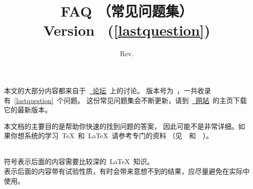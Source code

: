 \documentclass[a4paper]{article}
\begin{document}

 \def\cmdname{命令~(Commands)}
 \def\pkgname{宏包~(Packages)}
 \def\envname{环境~(Environments)}
 \def\Qname{\it 问题}
 \def\CTeXWWW{\href{http://www.ctex.org}{\CTeX{}~网站}}
 \def\CTeXBBS{\href{http://bbs.ctex.org}{\CTeX{}~论坛}}
 \def\CTeXFTP{\href{http://ftp.ctex.org}{\CTeX{} FTP}}


 \pagestyle{fancy}
 \fancyhf{}
 \fancyhead[L]{\small \leftmark}
 \fancyhead[R]{\small \thepage}


\title{{\bf\Huge \CTeX{} FAQ （常见问题集）}\\[1.0ex]
       \textsf{Version\ \faqversion\betaversion
       \hspace*{.5em}(\ref*{lastquestion})}}
\author{}
\date{\sf\small \RCSDate\hspace*{1em}Rev. \RCSRevision}

\maketitle


本文的大部分内容都来自于~\CTeXBBS~上的讨论。
版本号为~\faqversion，一共收录有~\ref*{lastquestion}~个问题。
这份常见问题集会不断更新，请到~\CTeXWWW~的主页下载它的最新版本。

本文档的主要目的是帮助你快速的找到问题的答案，
因此可能不是非常详细。如果你想系统的学习~\TeX{}~和~\LaTeX{}~请参考专门的资料
（见~~和~~）。

\begin{advanced}\small
\danger\\符号表示后面的内容需要比较深的~\LaTeX{}~知识。\enddanger
\ddanger\\表示后面的内容带有试验性质，有时会带来意想不到的结果，应尽量避免在实际中使用。\enddanger
\end{advanced}
\end{document}
